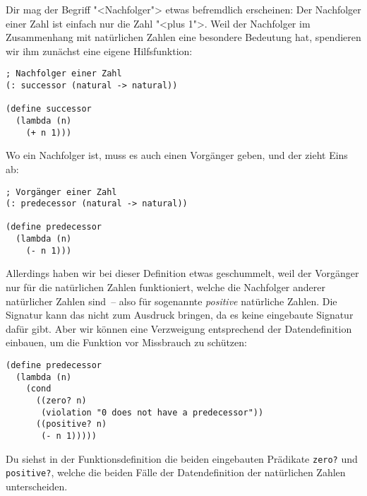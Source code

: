 Dir mag der Begriff "<Nachfolger"> etwas befremdlich erscheinen: Der
Nachfolger einer Zahl ist einfach nur die Zahl "<plus 1">.  Weil der
Nachfolger im Zusammenhang mit natürlichen Zahlen eine besondere
Bedeutung hat, spendieren wir ihm zunächst eine eigene Hilfsfunktion:
%
\begin{lstlisting}
; Nachfolger einer Zahl
(: successor (natural -> natural))

(define successor
  (lambda (n)
    (+ n 1)))
\end{lstlisting}
%
Wo ein Nachfolger ist, muss es auch einen Vorgänger geben, und der
zieht Eins ab:
%
\begin{lstlisting}
; Vorgänger einer Zahl
(: predecessor (natural -> natural))

(define predecessor
  (lambda (n)
    (- n 1)))
\end{lstlisting}
%
Allerdings haben wir bei dieser Definition etwas geschummelt, weil der
Vorgänger nur für die natürlichen Zahlen funktioniert, welche die
Nachfolger anderer natürlicher Zahlen sind~-- also für sogenannte
\textit{positive} natürliche Zahlen.
Die Signatur kann das nicht zum Ausdruck bringen, da es keine
eingebaute Signatur dafür gibt.  Aber wir können eine Verzweigung
entsprechend der Datendefinition einbauen, um die Funktion vor
Missbrauch zu schützen:
%
\begin{lstlisting}
(define predecessor
  (lambda (n)
    (cond
      ((zero? n)
       (violation "0 does not have a predecessor"))
      ((positive? n)
       (- n 1)))))
\end{lstlisting}
%
Du siehst in der Funktionsdefinition die beiden eingebauten Prädikate
\lstinline{zero?} und
\lstinline{positive?}, welche die
beiden Fälle der Datendefinition der natürlichen Zahlen unterscheiden.

